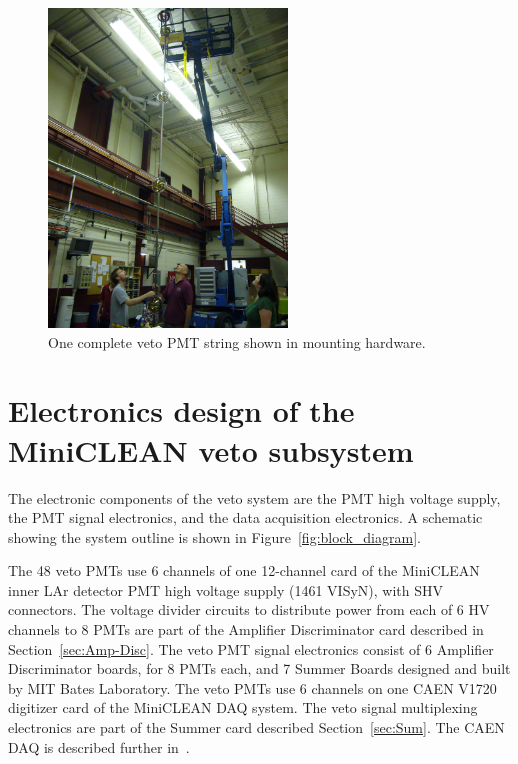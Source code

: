 \documentclass{JINST}
\begin{document}
\begin{figure}[ht]
\begin{center}
\includegraphics[width=2.5in]{graphics/pmtstring.JPG}
\caption{One complete veto PMT string shown in mounting hardware.
\label{fig:vetopmtstringpic}}
\end{center}
\end{figure}


\section{Electronics design of the MiniCLEAN veto subsystem}
\label{sec:electronics_design}
%
The electronic components of the veto system are the PMT high voltage
supply, the PMT signal electronics, and the data acquisition
electronics.  A schematic showing the system outline is shown in
Figure~\ref{fig:block_diagram}.

The 48 veto PMTs use 6 channels of one 12-channel card of the
MiniCLEAN inner LAr detector PMT high voltage supply (1461 VISyN),
with SHV connectors.  The voltage divider circuits to distribute power
from each of 6 HV channels to 8 PMTs are part of the Amplifier
Discriminator card described in Section~\ref{sec:Amp-Disc}.  The veto
PMT signal electronics consist of 6 Amplifier Discriminator boards,
for 8 PMTs each, and 7 Summer Boards designed and built by MIT Bates
Laboratory.  The veto PMTs use 6 channels on one CAEN V1720 digitizer
card of the MiniCLEAN DAQ system.  The veto signal multiplexing
electronics are part of the Summer card described
Section~\ref{sec:Sum}.  The CAEN DAQ is described further
in~\cite{ref:gastler_thesis}.
\end{document}
